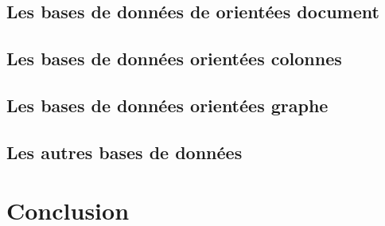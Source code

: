 \documentclass[11pt]{article}
\begin{document}
\subsection{Les bases de données de orientées document}

\subsection{Les bases de données orientées colonnes}

\subsection{Les bases de données orientées graphe}

\subsection{Les autres bases de données}

\section{Conclusion}
\end{document}
